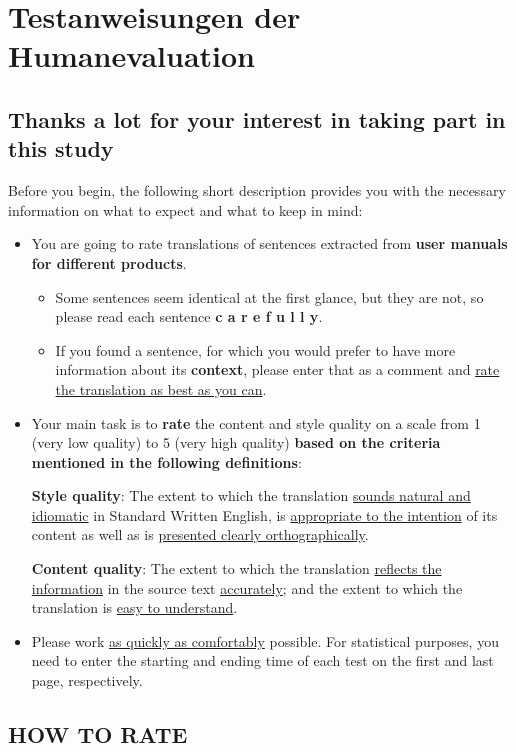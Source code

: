 \chapter{Testanweisungen der Humanevaluation}\label{app:1}

\section*{Thanks a lot for your interest in taking part in this study}

Before you begin, the following short description provides you with the necessary information on what to expect and what to keep in mind:

\begin{itemize}
\item You are going to rate translations of sentences extracted from \textbf{user manuals for different products}.
\begin{itemize}
\item Some sentences seem identical at the first glance, but they are not, so please read each sentence \textbf{c a r e f u l l y}.
\item If you found a sentence, for which you would prefer to have more information about its \textbf{context}, please enter that as a comment and \ul{rate the translation as best as you can}.
\end{itemize}

\item Your main task is to \textbf{rate} the content and style quality on a scale from 1 (very low quality) to 5 (very high quality) \textbf{based on the criteria mentioned in the following definitions}:

\textbf{Style quality}: The extent to which the translation \ul{sounds natural and idiomatic} in Standard Written English, is \ul{appropriate to the intention} of its content as well as is \ul{presented clearly orthographically}.

\textbf{Content quality}: The extent to which the translation \ul{reflects the information} in the source text \ul{accurately}; and the extent to which the translation is \ul{easy to understand}.

\item Please work \ul{as quickly as comfortably} possible. For statistical purposes, you need to enter the starting and ending time of each test on the first and last page, respectively.
\end{itemize}


\section*{HOW TO RATE}

